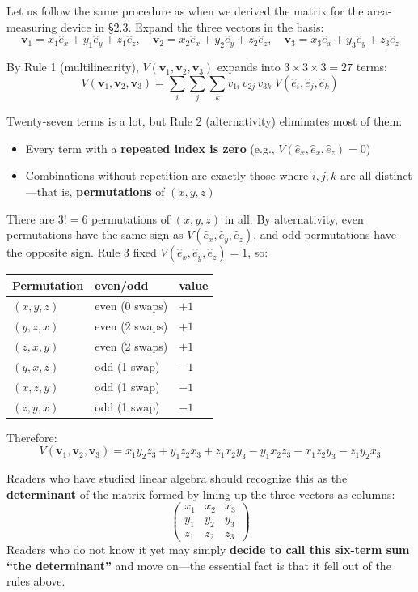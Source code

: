 Let us follow the same procedure as when we derived the matrix for the
area-measuring device in §2.3. Expand the three vectors in the basis:
\[\mathbf{v}_1 = x_1 \hat{e}_x + y_1 \hat{e}_y + z_1 \hat{e}_z, \quad \mathbf{v}_2 = x_2 \hat{e}_x + y_2 \hat{e}_y + z_2 \hat{e}_z, \quad \mathbf{v}_3 = x_3 \hat{e}_x + y_3 \hat{e}_y + z_3 \hat{e}_z\]

By Rule 1 (multilinearity),
\(V(\mathbf{v}_1, \mathbf{v}_2, \mathbf{v}_3)\) expands into
\(3 \times 3 \times 3 = 27\) terms:
\[V(\mathbf{v}_1, \mathbf{v}_2, \mathbf{v}_3) = \sum_i\sum_j\sum_k v_{1i}\,v_{2j}\,v_{3k}\; V(\hat{e}_i, \hat{e}_j, \hat{e}_k)\]

Twenty-seven terms is a lot, but Rule 2 (alternativity) eliminates most
of them:

\begin{itemize}
\item
  Every term with a \textbf{repeated index is zero} (e.g.,
  \(V(\hat{e}_x, \hat{e}_x, \hat{e}_z) = 0\))
\item
  Combinations without repetition are exactly those where \(i, j, k\)
  are all distinct---that is, \textbf{permutations} of \((x,y,z)\)
\end{itemize}

There are \(3! = 6\) permutations of \((x, y, z)\) in all. By
alternativity, even permutations have the same sign as
\(V(\hat{e}_x, \hat{e}_y, \hat{e}_z)\), and odd permutations have the
opposite sign. Rule 3 fixed \(V(\hat{e}_x, \hat{e}_y, \hat{e}_z) = 1\),
so:

\begin{longtable}[]{@{}lll@{}}
\toprule\noalign{}
Permutation & even/odd & value \\
\midrule\noalign{}
\endhead
\bottomrule\noalign{}
\endlastfoot
\((x,y,z)\) & even (0 swaps) & \(+1\) \\
\((y,z,x)\) & even (2 swaps) & \(+1\) \\
\((z,x,y)\) & even (2 swaps) & \(+1\) \\
\((y,x,z)\) & odd (1 swap) & \(-1\) \\
\((x,z,y)\) & odd (1 swap) & \(-1\) \\
\((z,y,x)\) & odd (1 swap) & \(-1\) \\
\end{longtable}

Therefore:
\[V(\mathbf{v}_1, \mathbf{v}_2, \mathbf{v}_3) = x_1 y_2 z_3 + y_1 z_2 x_3 + z_1 x_2 y_3 - y_1 x_2 z_3 - x_1 z_2 y_3 - z_1 y_2 x_3\]

Readers who have studied linear algebra should recognize this as the
\textbf{determinant} of the matrix formed by lining up the three vectors
as columns:
\[\begin{pmatrix} x_1 & x_2 & x_3 \\ y_1 & y_2 & y_3 \\ z_1 & z_2 & z_3 \end{pmatrix}\]
Readers who do not know it yet may simply
\textbf{decide to call this six-term sum “the determinant”} and move
on---the essential fact is that it fell out of the rules above.

